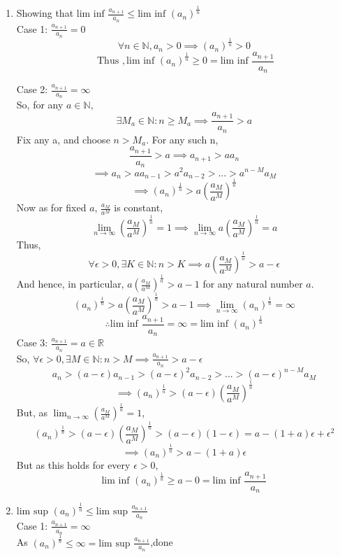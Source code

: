 \documentclass[20pt]{extarticle} %
\begin{document}
\begin{enumerate}[label=\Roman*]
	\item Showing that $\text{lim inf } \frac{a_{n+1}}{a_n} \leq \text{lim inf }(a_n)^\frac{1}{n}$\\
		Case 1:  $ \frac{a_{n+1}}{a_n}=0 $
		\[ \forall n \in \mathbb{N}, a_n > 0 \implies (a_n)^ \frac{1}{n}> 0 \]
		\[ \text{ Thus } , \text{lim inf }(a_n)^ \frac{1}{n} \geq 0 = \text{lim inf } \frac{a_{n+1}}{a_n} 	 \]

		Case 2:  $ \frac{a_{n+1}}{a_n}= \infty $\\
		So, for any $ a \in \mathbb{N},$
		\[ \exists M_a \in \mathbb{N}: n\geq	M_a \implies \frac{a_{n+1}}{a_n}> a \]
		Fix any a, and choose $n>M_a$. For any such n,
		\[  \frac{a_{n+1}}{a_n}>a \implies a_{n+1} >aa_n  \]
		\[ \implies a_n>aa_{n-1}> a^2a_{n-2}>...>a^{n-M}a_M \]
		\[ \implies  (a_n)^ \frac{1}{n} > a( \frac{a_M}{a^M} )^	\frac{1}{n} \]
		Now as for fixed $a$, $ \frac{a_M}{a^M} $ is constant,
		\[ \lim_{n \to \infty} (\frac{a_M}{a^M})^{ \frac{1}{n} }=1 \implies \lim_{n \to \infty} a(\frac{a_M}{a^M})^{ \frac{1}{n} }=a\]
		Thus, \[\forall \epsilon >0, \exists K \in \mathbb{N}: n>K \implies a(\frac{a_M}{a^M})^{ \frac{1}{n} }>a- \epsilon \]
		And hence, in particular, $a(\frac{a_M}{a^M})^{ \frac{1}{n} }>a-1$ for any natural number $a$.
		\[ (a_n)^ \frac{1}{n}  > a(\frac{a_M}{a^M})^{ \frac{1}{n} }> a-1 \implies \lim_{n \to \infty} (a_n)^ \frac{1}{n}= \infty  \]
		\[ \therefore  \text{lim inf } \frac{a_{n+1}}{a_n} = \infty=\text{lim inf }(a_n)^\frac{1}{n}\]
		Case 3:  $ \frac{a_{n+1}}{a_n}= a \in \mathbb{R} $\\
		So, $ \forall \epsilon > 0,  \exists M \in \mathbb{N}: n > M \implies \frac{a_{n+1}}{a_n} > a-\epsilon$
		\[ a_n>(a-\epsilon) a_{n-1}>(a-\epsilon)^2 a_{n-2}>...>(a-\epsilon)^{n-M} a_M \]
		\[ \implies (a_n)^ \frac{1}{n}>(a- \epsilon) (\frac{a_M}{a^M})^{ \frac{1}{n} }\]
	But, as $\lim_{n \to \infty} (\frac{a_M}{a^M})^ \frac{1}{n}=1 $,\\
	\[ (a_n)^ \frac{1}{n}>(a- \epsilon) (\frac{a_M}{a^M})^{ \frac{1}{n} }>(a-\epsilon)(1-\epsilon)=a-(1+a)\epsilon+ \epsilon^2 \]
	\[ \implies  (a_n)^ \frac{1}{n}>a-(1+a)\epsilon \]
		But as this holds for every $\epsilon >0$,
		\[ \text{lim inf }(a_n)^ \frac{1}{n} \geq a-0= \text{lim inf } \frac{a_{n+1}}{a_n}  \]

	\item $\text{lim sup }(a_n)^\frac{1}{n} \leq \text{lim sup }\frac{a_{n+1}}{a_n}$\\
		Case 1:  $ \frac{a_{n+1}}{a_n}=\infty $\\
		As $(a_n)^ \frac{1}{n} \leq \infty = \text{lim sup }\frac{a_{n+1}}{a_n}$,done\\


\end{enumerate}
\end{document}
